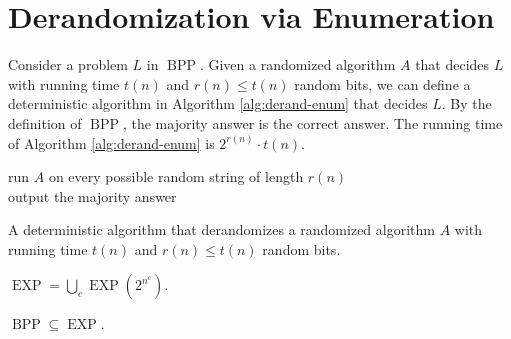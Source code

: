 \documentclass[letterpaper, reqno,11pt]{article}
\DeclareMathOperator{\BPP}{BPP}
\DeclareMathOperator{\EXP}{EXP}
\begin{document}
\section{Derandomization via Enumeration}

Consider a problem $L$ in $\BPP$. Given a randomized algorithm $A$ that decides $L$ with running time $t(n)$ and $r(n) \leq t(n)$ random bits, we can define a deterministic algorithm in Algorithm \ref{alg:derand-enum} that decides $L$. By the definition of $\BPP$, the majority answer is the correct answer. The running time of Algorithm \ref{alg:derand-enum} is $2^{r(n)} \cdot t(n)$.

\begin{algorithm}
  run $A$ on every possible random string of length $r(n)$ \\
  output the majority answer
  \caption{A deterministic algorithm that derandomizes a randomized algorithm $A$ with running time $t(n)$ and $r(n) \leq t(n)$ random bits.}
  \label{alg:derand-enum}
\end{algorithm}

\begin{definition}
  $\EXP = \bigcup_c \EXP(2^{n^c})$.
\end{definition}

\begin{corollary}
  $\BPP \subseteq \EXP$.
\end{corollary}
\end{document}
